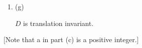 \begin{enumerate}
\begin{enumerate}[label=(\alph*)]
\begin{proof}
      But we haven't yet identified any algebra on which $D$ is countably additive.
    \end{proof}

  \item (g)
    \begin{claim*}
      $D$ is translation invariant.
    \end{claim*}
  \end{enumerate}
  [Note that a in part (c) is a positive integer.]

\end{enumerate}
